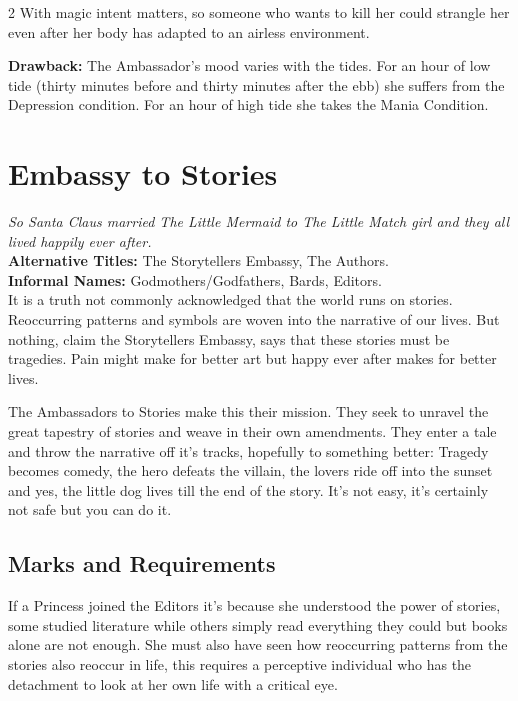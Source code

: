 \begin{multicols}{2}
With magic intent matters, so someone who wants to kill her could strangle her even after her body has adapted to an airless environment. 

\textbf{Drawback:} The Ambassador's mood varies with the tides. For an hour of low tide (thirty minutes before and thirty minutes after the ebb) she suffers from the Depression condition. For an hour of high tide she takes the Mania Condition. 

\section*{Embassy to Stories}
\label{sec:EmbassyStories}

\textit{So Santa Claus married The Little Mermaid to The Little Match girl and they all lived happily ever after. }\\ 

\noindent \textbf{Alternative Titles:} The Storytellers Embassy, The Authors.\\

\noindent \textbf{Informal Names:} Godmothers/Godfathers, Bards, Editors.\\

\noindent It is a truth not commonly acknowledged that the world runs on stories. Reoccurring patterns and symbols are woven into the narrative of our lives. But nothing, claim the Storytellers Embassy, says that these stories must be tragedies. Pain might make for better art but happy ever after makes for better lives.

The Ambassadors to Stories make this their mission. They seek to unravel the great tapestry of stories and weave in their own amendments. They enter a tale and throw the narrative off it's tracks, hopefully to something better: Tragedy becomes comedy, the hero defeats the villain, the lovers ride off into the sunset and yes, the little dog lives till the end of the story. It's not easy, it's certainly not safe but you can do it. 

\subsection*{Marks and Requirements}
If a Princess joined the Editors it's because she understood the power of stories, some studied literature while others simply read everything they could but books alone are not enough. She must also have seen how reoccurring patterns from the stories also reoccur in life, this requires a perceptive individual who has the detachment to look at her own life with a critical eye.


\end{multicols}
